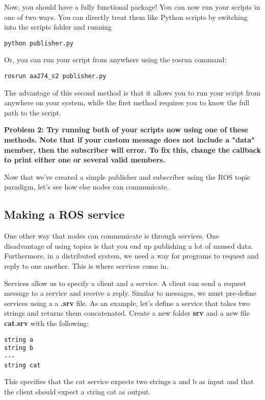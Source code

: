 Now, you should have a fully functional package! You can now run your scripts in one of two ways. You can directly treat them like Python scripts by switching into the scripts folder and running 

\begin{lstlisting}
python publisher.py
\end{lstlisting}

Or, you can run your script from anywhere using the rosrun command:

\begin{lstlisting}
rosrun aa274_s2 publisher.py
\end{lstlisting}
The advantage of this second method is that it allows you to run your script from anywhere on your system, while the first method requires you to know the full path to the script.

\textbf{Problem 2: Try running both of your scripts now using one of these methods. Note that if your custom message does not include a "data" member, then the subscriber will error. To fix this, change the callback to print either one or several valid members.}

Now that we've created a simple publisher and subscriber using the ROS topic paradigm, let's see how else nodes can communicate. 
\subsection{Making a ROS service}

One other way that nodes can communicate is through services. One disadvantage of using topics is that you end up publishing a lot of unused data. Furthermore, in a distributed system, we need a way for programs to request and reply to one another. This is where services come in. 

Services allow us to specify a client and a service. A client can send a request message to a service and receive a reply. Similar to messages, we must pre-define services using a a \textbf{.srv} file. As an example, let's define a service that takes two strings and returns them concatenated. Create a new folder \textbf{srv} and a new file \textbf{cat.srv} with the following:

\begin{lstlisting}
string a
string b
---
string cat
\end{lstlisting}

This specifies that the cat service expects two strings a and b as input and that the client should expect a string cat as output. 

